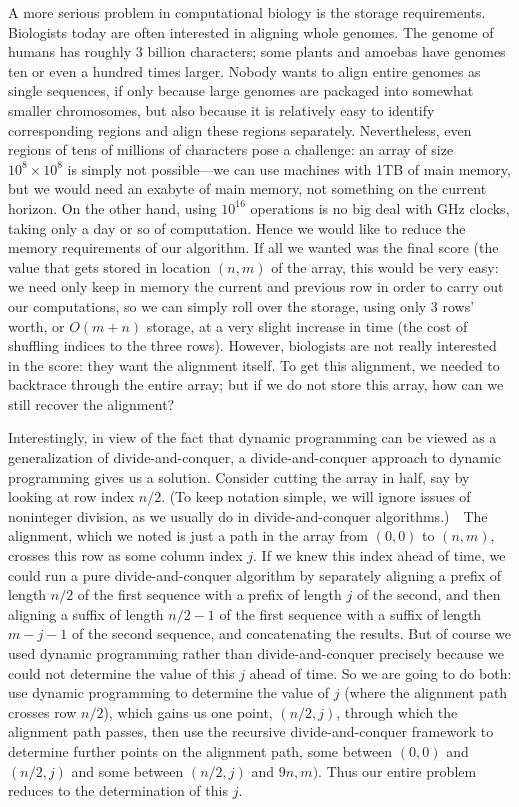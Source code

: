 \documentclass[11pt]{article}
\begin{document}
A more serious problem in computational biology is the storage requirements.
Biologists today are often interested in aligning whole genomes.  The genome
of humans has roughly 3 billion characters; some plants and amoebas have
genomes ten or even a hundred times larger.  Nobody wants to align entire
genomes as single sequences, if only because large genomes are packaged into
somewhat smaller chromosomes, but also because it is relatively easy to
identify corresponding regions and align these regions separately.
Nevertheless, even regions of tens of millions of characters pose
a challenge: an array of size $10^{8}\times 10^{8}$ is simply not
possible---we can use machines with 1TB of main memory, but we would
need an exabyte of main memory, not something on the current horizon.
On the other hand, using $10^{16}$ operations is no big deal with GHz clocks,
taking only a day or so of computation.  Hence we would like to reduce
the memory requirements of our algorithm.  If all we wanted was the final
score (the value that gets stored in location $(n,m)$ of the array, this
would be very easy: we need only keep in memory the current and previous
row in order to carry out our computations, so we can simply roll over
the storage, using only 3 rows' worth, or $O(m+n)$ storage, at a very slight
increase in time (the cost of shuffling indices to the three rows).
However, biologists are not really interested in the score: they want the
alignment itself.  To get this alignment, we needed to backtrace through
the entire array; but if we do not store this array, how can we still
recover the alignment?

Interestingly, in view of the fact that dynamic programming can be viewed
as a generalization of divide-and-conquer, a divide-and-conquer approach
to dynamic programming gives us a solution.  Consider cutting the
array in half, say by looking at row index $n/2$.  (To keep notation
simple, we will ignore issues of noninteger division, as we usually do
in divide-and-conquer algorithms.)\ \ The alignment, which we noted is
just a path in the array from $(0,0)$ to $(n,m)$, crosses this row
as some column index $j$.  If we knew this index ahead of time, we could
run a pure divide-and-conquer algorithm by separately aligning a prefix
of length $n/2$ of the first sequence with a prefix of length $j$ of the
second, and then aligning a suffix of length $n/2-1$ of the first sequence
with a suffix of length $m-j-1$ of the second sequence, and concatenating
the results.  But of course we used dynamic programming rather than
divide-and-conquer precisely because we could not determine the value of
this $j$ ahead of time.   So we are going to do both: use dynamic programming
to determine the value of $j$ (where the alignment path crosses row $n/2$),
which gains us one point, $(n/2,j)$, through which the alignment path passes,
then use the recursive divide-and-conquer framework to determine further
points on the alignment path, some between $(0,0)$ and $(n/2,j)$ and some
between $(n/2,j)$ and $9n,m)$.  Thus our entire problem reduces to the
determination of this $j$.
\end{document}
